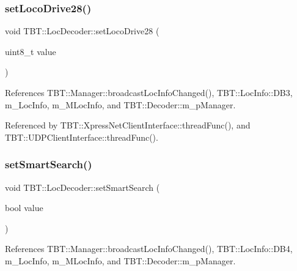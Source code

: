 \subsubsection{\texorpdfstring{set\+Loco\+Drive28()}{setLocoDrive28()}}
{\footnotesize\ttfamily void T\+B\+T\+::\+Loc\+Decoder\+::set\+Loco\+Drive28 (\begin{DoxyParamCaption}\item[{uint8\+\_\+t}]{value }\end{DoxyParamCaption})\hspace{0.3cm}{\ttfamily [inline]}}



References T\+B\+T\+::\+Manager\+::broadcast\+Loc\+Info\+Changed(), T\+B\+T\+::\+Loc\+Info\+::\+D\+B3, m\+\_\+\+Loc\+Info, m\+\_\+\+M\+Loc\+Info, and T\+B\+T\+::\+Decoder\+::m\+\_\+p\+Manager.



Referenced by T\+B\+T\+::\+Xpress\+Net\+Client\+Interface\+::thread\+Func(), and T\+B\+T\+::\+U\+D\+P\+Client\+Interface\+::thread\+Func().

\mbox{\label{classTBT_1_1LocDecoder_ab17b176f9fb53af19911611dc35c4e76_ab17b176f9fb53af19911611dc35c4e76}} 
\subsubsection{\texorpdfstring{set\+Smart\+Search()}{setSmartSearch()}}
{\footnotesize\ttfamily void T\+B\+T\+::\+Loc\+Decoder\+::set\+Smart\+Search (\begin{DoxyParamCaption}\item[{bool}]{value }\end{DoxyParamCaption})\hspace{0.3cm}{\ttfamily [inline]}}



References T\+B\+T\+::\+Manager\+::broadcast\+Loc\+Info\+Changed(), T\+B\+T\+::\+Loc\+Info\+::\+D\+B4, m\+\_\+\+Loc\+Info, m\+\_\+\+M\+Loc\+Info, and T\+B\+T\+::\+Decoder\+::m\+\_\+p\+Manager.

\mbox{\label{classTBT_1_1LocDecoder_afa7b68a8e717065e39c80a83cbd9bb66_afa7b68a8e717065e39c80a83cbd9bb66}} 
